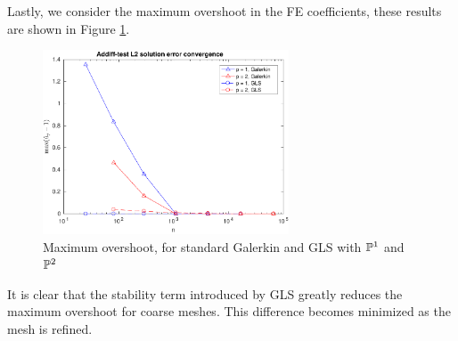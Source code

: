 \documentclass{article}
\begin{document}
\begin{itemize}
	Lastly, we consider the maximum overshoot in the FE coefficients, these results are shown in Figure \ref{fig:addiff-test_maxover}. 
	\begin{figure}[H]
		\centering
		\includegraphics[width=0.65\textwidth]{addiff-test_maxover.pdf}
		\caption{Maximum overshoot, for standard Galerkin and GLS with \(\mathbb{P}^1\) and \(\mathbb{P}^2 \)}
		\label{fig:addiff-test_maxover}
	\end{figure}
	It is clear that the stability term introduced by GLS greatly reduces the maximum overshoot for coarse meshes. This difference becomes minimized as the mesh is refined.
	
	
\end{itemize}

\clearpage
\end{document}
